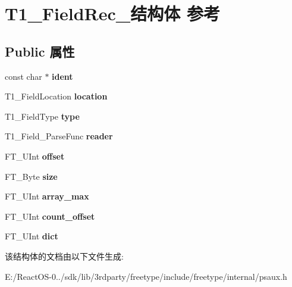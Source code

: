 \hypertarget{struct_t1___field_rec__}{}\section{T1\+\_\+\+Field\+Rec\+\_\+结构体 参考}
\label{struct_t1___field_rec__}
\subsection*{Public 属性}
\begin{DoxyCompactItemize}
\item 
\mbox{\label{struct_t1___field_rec___aaf70ae870eff9ea2b0518ef5e7301cfd}} 
const char $\ast$ {\bfseries ident}
\item 
\mbox{\label{struct_t1___field_rec___a1e17111c68df523f82d20bddd822ca4d}} 
T1\+\_\+\+Field\+Location {\bfseries location}
\item 
\mbox{\label{struct_t1___field_rec___ad873155b36b72db9a1feaf2699fed1ce}} 
T1\+\_\+\+Field\+Type {\bfseries type}
\item 
\mbox{\label{struct_t1___field_rec___a95e227de47c22bdadd77f797ff43d89d}} 
T1\+\_\+\+Field\+\_\+\+Parse\+Func {\bfseries reader}
\item 
\mbox{\label{struct_t1___field_rec___a41b503016f68291e061a2e29498982c1}} 
F\+T\+\_\+\+U\+Int {\bfseries offset}
\item 
\mbox{\label{struct_t1___field_rec___a8ce74a7ad2276abe8942883e7fbb1241}} 
F\+T\+\_\+\+Byte {\bfseries size}
\item 
\mbox{\label{struct_t1___field_rec___a87f063bd3ad0dcfa30c00946d9f9cae8}} 
F\+T\+\_\+\+U\+Int {\bfseries array\+\_\+max}
\item 
\mbox{\label{struct_t1___field_rec___a41d8814cc651d0276f8cfad751721326}} 
F\+T\+\_\+\+U\+Int {\bfseries count\+\_\+offset}
\item 
\mbox{\label{struct_t1___field_rec___a509f7ddb1e0ffe050017daa29223e224}} 
F\+T\+\_\+\+U\+Int {\bfseries dict}
\end{DoxyCompactItemize}


该结构体的文档由以下文件生成\+:\begin{DoxyCompactItemize}
\item 
E\+:/\+React\+O\+S-\/0../sdk/lib/3rdparty/freetype/include/freetype/internal/psaux.\+h\end{DoxyCompactItemize}

